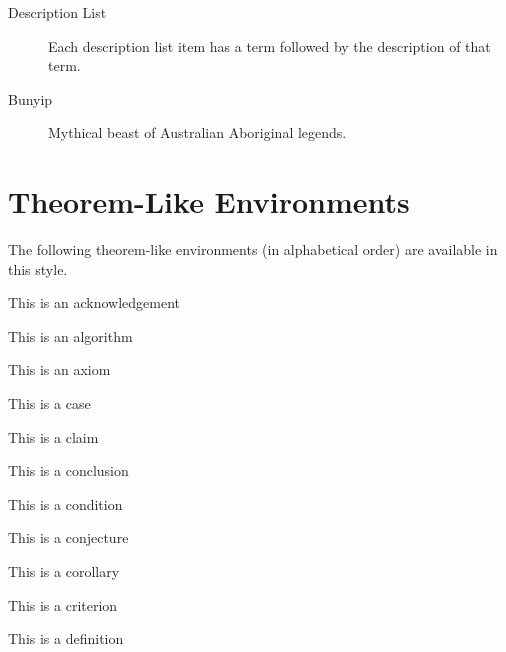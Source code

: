 \begin{description}
\item[Description List] Each description list item has a term
followed by the description of that term.

\item[Bunyip] Mythical beast of Australian Aboriginal legends.
\end{description}


\section{Theorem-Like Environments}

The following theorem-like environments (in alphabetical order) are available
in this style.

\begin{acknowledgement}
This is an acknowledgement
\end{acknowledgement}

\begin{algorithm}
This is an algorithm
\end{algorithm}

\begin{axiom}
This is an axiom
\end{axiom}

\begin{case}
This is a case
\end{case}

\begin{claim}
This is a claim
\end{claim}

\begin{conclusion}
This is a conclusion
\end{conclusion}

\begin{condition}
This is a condition
\end{condition}

\begin{conjecture}
This is a conjecture
\end{conjecture}

\begin{corollary}
This is a corollary
\end{corollary}

\begin{criterion}
This is a criterion
\end{criterion}

\begin{definition}
This is a definition
\end{definition}

